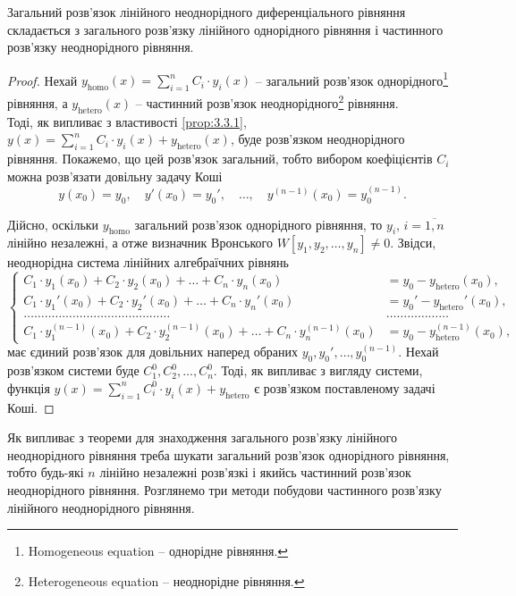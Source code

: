 \begin{theorem}
	Загальний розв’язок лінійного неоднорідного диференціального рівняння складається з загального розв’язку лінійного однорідного рівняння і частинного розв’язку неоднорідного рівняння.
\end{theorem}
\begin{proof}
	Нехай $y_{\text{homo}}(x) = \sum_{i = 1}^n C_i \cdot y_i(x)$ -- загальний розв’язок однорідного\footnote{Homogeneous equation -- однорідне рівняння.} рівняння, а $y_{\text{hetero}}(x)$ -- частинний розв’язок неоднорідного\footnote{Heterogeneous equation -- неоднорідне рівняння.} рівняння. \\

	Тоді, як випливає з властивості \ref{prop:3.3.1}, $y(x) = \sum_{i = 1}^n C_i \cdot y_i(x) + y_{\text{hetero}}(x)$, буде розв’язком неоднорідного рівняння. Покажемо, що цей розв’язок  загальний, тобто вибором коефіцієнтів $C_i$ можна розв’язати довільну задачу Коші
	\begin{equation}
		\label{eq:3.3.14}
		y(x_0) = y_0, \quad y'(x_0) = y_0', \quad \ldots, \quad y^{(n - 1)}(x_0) = y_0^{(n - 1)}.
	\end{equation}

	Дійсно, оскільки $y_{\text{homo}}$ загальний розв’язок однорідного рівняння, то $y_i$, $i = \overline{1, n}$ лінійно незалежні, а отже визначник Вронського $W[y_1, y_2, \ldots, y_n] \ne 0$. Звідси, неоднорідна система лінійних алгебраїчних рівнянь 
	\begin{equation}
		\label{eq:3.3.15}
		\left\{ \begin{aligned}
			C_1 \cdot y_1(x_0) + C_2 \cdot y_2(x_0) + \ldots + C_n \cdot y_n(x_0) &= y_0 - y_{\text{hetero}}(x_0), \\
			C_1 \cdot y_1'(x_0) + C_2 \cdot y_2'(x_0) + \ldots + C_n \cdot y_n'(x_0) &= y_0' - y_{\text{hetero}}'(x_0), \\
			\ldots \ldots \ldots \ldots \ldots \ldots \ldots \ldots \ldots \ldots \ldots \ldots \ldots \ldots & \ldots \ldots \ldots \ldots \ldots \ldots 	\\
			C_1 \cdot y_1^{(n - 1)}(x_0) + C_2 \cdot y_2^{(n - 1)}(x_0) + \ldots + C_n \cdot y_n^{(n - 1)}(x_0) &= y_0 - y_{\text{hetero}}^{(n - 1)}(x_0),
		\end{aligned} \right.
	\end{equation}
	має єдиний розв’язок для довільних наперед обраних $y_0, y_0', \ldots, y_0^{(n - 1)}$. Нехай розв’язком системи буде $C_1^0, C_2^0, \ldots, C_n^0$. Тоді, як випливає з вигляду системи, функція $y(x) = \sum_{i = 1}^n C_i^0 \cdot y_i(x) + y_{\text{hetero}}$ є розв’язком поставленому задачі Коші.
\end{proof}

Як випливає з теореми для знаходження загального розв’язку лінійного неоднорідного рівняння треба шукати загальний розв’язок однорідного рівняння, тобто будь-які $n$ лінійно незалежні розв’язкі і якийсь частинний розв’язок неоднорідного рівняння. Розглянемо три методи побудови частинного розв’язку лінійного неоднорідного рівняння.